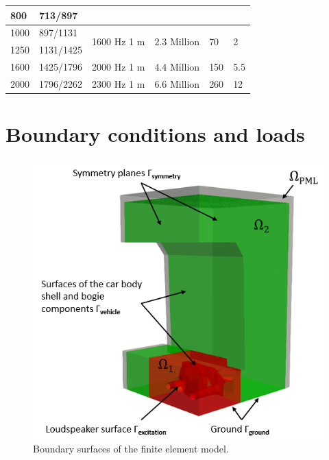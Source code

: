 \begin{table}[H]
\begin{tabularx}{\textwidth}{|X|X|c|X|X|X|}
		800                              & 713/897                    &                                 &                               &                         &                                        \\ \hline
		1000                             & 897/1131                   & \multirow{2}{*}{1600 Hz 1 m}    & \multirow{2}{*}{2.3 Million}  & \multirow{2}{*}{70}     & \multirow{2}{*}{2}                     \\ \cline{1-2}
		1250                             & 1131/1425                  &                                 &                               &                         &                                        \\ \hline
		1600                             & 1425/1796                  & 2000 Hz 1 m                     & 4.4 Million                   & 150                     & 5.5                                    \\ \hline
		2000                             & 1796/2262                  & 2300 Hz 1 m                     & 6.6 Million                   & 260                     & 12                                     \\ \hline
	\end{tabularx}
\end{table}

\newpage
\section{Boundary conditions and loads}
\label{section:boundary_conditions}

\begin{figure}
	\centering
	\includegraphics{fig/chap4/region_labels.png}
	\caption{Boundary surfaces of the finite element model.}
	\label{fig:boundary_conditions}
\end{figure}


